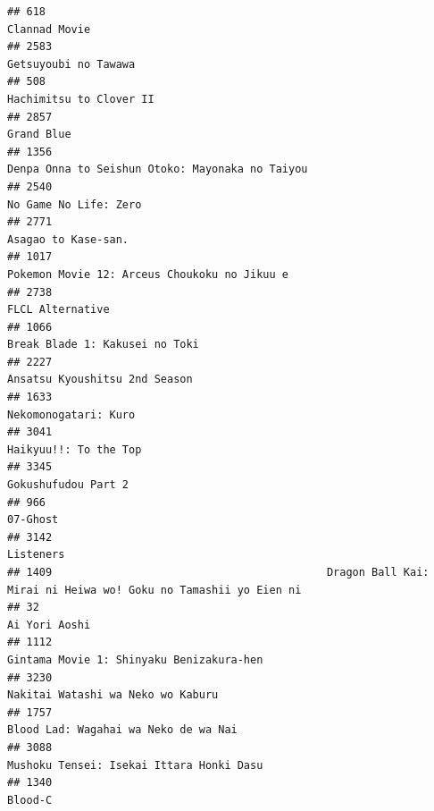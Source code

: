 \documentclass[
]{article}
\begin{document}
\begin{verbatim}
## 618                                                                                              Clannad Movie
## 2583                                                                                      Getsuyoubi no Tawawa
## 508                                                                                    Hachimitsu to Clover II
## 2857                                                                                                Grand Blue
## 1356                                                           Denpa Onna to Seishun Otoko: Mayonaka no Taiyou
## 2540                                                                                     No Game No Life: Zero
## 2771                                                                                       Asagao to Kase-san.
## 1017                                                              Pokemon Movie 12: Arceus Choukoku no Jikuu e
## 2738                                                                                          FLCL Alternative
## 1066                                                                            Break Blade 1: Kakusei no Toki
## 2227                                                                             Ansatsu Kyoushitsu 2nd Season
## 1633                                                                                      Nekomonogatari: Kuro
## 3041                                                                                     Haikyuu!!: To the Top
## 3345                                                                                       Gokushufudou Part 2
## 966                                                                                                   07-Ghost
## 3142                                                                                                 Listeners
## 1409                                           Dragon Ball Kai: Mirai ni Heiwa wo! Goku no Tamashii yo Eien ni
## 32                                                                                               Ai Yori Aoshi
## 1112                                                                  Gintama Movie 1: Shinyaku Benizakura-hen
## 3230                                                                         Nakitai Watashi wa Neko wo Kaburu
## 1757                                                                      Blood Lad: Wagahai wa Neko de wa Nai
## 3088                                                                  Mushoku Tensei: Isekai Ittara Honki Dasu
## 1340                                                                                                   Blood-C

\end{verbatim}
\end{document}
